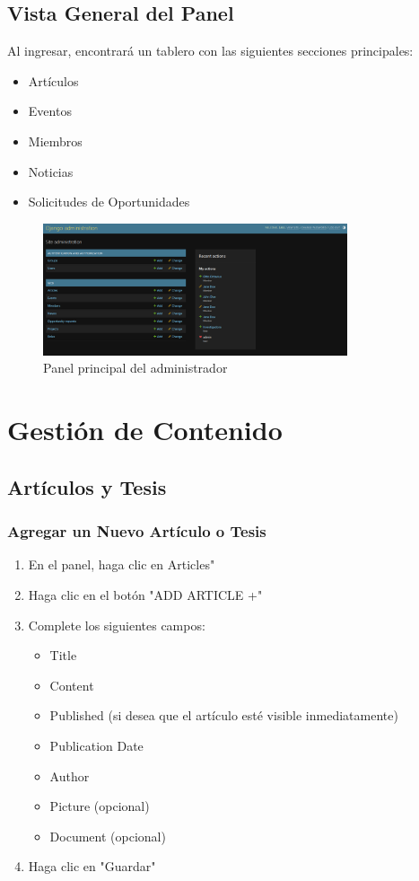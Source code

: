 \documentclass[12pt,letterpaper]{report}
\begin{document}
\section{Vista General del Panel}
Al ingresar, encontrará un tablero con las siguientes secciones principales:
\begin{itemize}
    \item Artículos
    \item Eventos
    \item Miembros
    \item Noticias
    \item Solicitudes de Oportunidades
\end{itemize}

\begin{figure}[H]
    \centering
    \includegraphics[width=0.8\textwidth]{images/panel.png}
    \caption{Panel principal del administrador}
\end{figure}

\chapter{Gestión de Contenido}

\section{Artículos y Tesis}
\subsection{Agregar un Nuevo Artículo o Tesis}
\begin{enumerate}
    \item En el panel, haga clic en  Articles"
    \item Haga clic en el botón "ADD ARTICLE +"
    \item Complete los siguientes campos:
        \begin{itemize}
            \item Title
            \item Content
            \item Published (si desea que el artículo esté visible inmediatamente)
            \item Publication Date
            \item Author
            \item Picture (opcional)
            \item Document (opcional)
        \end{itemize}
    \item Haga clic en "Guardar"
\end{enumerate}
\end{document}
